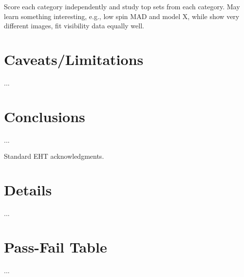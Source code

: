 \documentclass[twocolumn,tighten,dvipsnames]{aastex63}
\newcommand\<{{\langle}}
\renewcommand\>{{\rangle}} %
\begin{document}
Score each category independently and study top sets from each category.  May learn something interesting, e.g., low spin MAD and model X, while show very different images, fit visibility data equally well.

\section{Caveats/Limitations}
\label{sec:caveats}

...

\section{Conclusions}
\label{sec:conclusions}

...

\acknowledgments

Standard EHT acknowledgments.

\vspace{5mm}


\appendix
\section{Details}
\label{sec:details}

...

\section{Pass-Fail Table}
\label{sec:passfail}

...




\end{document}
